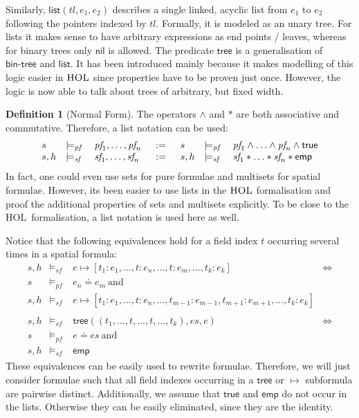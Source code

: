 \documentclass{scrartcl}
\theoremstyle{definition}
\newtheorem{definition}{Definition}
\newcommand{\HOL}{{\textsc{HOL}}}
\newcommand{\nil}{{\textsf{nil}}}
\newcommand{\pftrue}{{\textsf{true}}}
\newcommand{\pfequal}[2]{\ensuremath{#1 \doteq #2}}
\newcommand{\modelspf}{{\models_{\textit{pf}}\ }}
\newcommand{\modelssf}{{\models_{\textit{sf}}\ }}
\newcommand{\sfemp}{{\textsf{emp}}}
\newcommand{\sftree}{{\textsf{tree}}}
\newcommand{\sfpointsto}[2]{#1 \mapsto [#2]}
\newcommand{\sfbintree}{{\textsf{bin-tree}}}
\newcommand{\sflist}{{\textsf{list}}}
\newcommand{\varpf}[1]{\textit{pf}_{#1}}
\newcommand{\varsf}[1]{\textit{sf}_{#1}}
\begin{document}
Similarly, $\sflist (tl, e_1, e_2)$ describes a single linked, acyclic list
from $e_1$ to $e_2$ following the pointers indexed by $tl$. Formally, it is
modeled as an unary tree. For lists it makes
sense to have arbitrary expressions as end points / leaves, whereas for binary
trees only $\nil$ is allowed. The predicate $\sftree$ is a generalisation of
$\sfbintree$ and $\sflist$. It has been introduced mainly because it makes
modelling of this logic easier in $\HOL$ since properties have to be proven
just once. However, the logic is now able to talk about trees of arbitrary, but
fixed width.
\bigskip

\begin{definition}[Normal Form]
The operators $\wedge$ and $*$ are both associative and
commutative. Therefore, a list notation can be used:
%
\setlength{\arraycolsep}{2pt}
\[
\begin{array}{lll@{\hspace{15pt}}c@{\hspace{15pt}}lll}
   s & \modelspf & \varpf 1, \ldots, \varpf n & := & s & \modelspf & \varpf 1 \wedge \ldots \wedge
   \varpf n \wedge \pftrue \\
   s, h & \modelssf & \varsf 1, \ldots, \varsf n & := & s, h & \modelssf & \varsf 1 * \ldots *
   \varsf n * \sfemp
\end{array}
\]
%
In fact, one could even use sets for pure formulae and multisets for spatial
formulae. However, its been easier to use lists in the $\HOL$ formalisation
and proof the additional properties of sets and multisets explicitly.
To be close to the \HOL\ formalisation, a list notation is used here as well.

Notice that the following equivalences hold for a field index $t$
occurring several times in a spatial formula:
%
\[
\begin{array}{lllr}
s, h & \modelssf & \sfpointsto e {t_1:e_1, \ldots, t: e_n, \ldots, t:
  e_m, \ldots, t_k : e_k} & \Longleftrightarrow \\
s & \modelspf & \pfequal {e_n} {e_m}\ \text{and} \\
s, h & \modelssf & \sfpointsto e {t_1:e_1, \ldots, t: e_n, \ldots, t_{m-1}:
  e_{m-1}, t_{m+1}: e_{m+1}, \ldots, t_k : e_k} \\ \\

s, h & \modelssf & \sftree \left((t_1, \ldots, t, \ldots, t, \ldots,
  t_k),\textit{es},e\right) & \Longleftrightarrow \\
s & \modelspf & \pfequal {e} {\textit{es}}\ \text{and} \\
s, h & \modelssf & \sfemp
\end{array}
\]
%
These equivalences can be easily used to rewrite formulae. Therefore, we will
just consider formulae such that all field indexes occurring in a $\sftree$ or
$\mapsto$ subformula are pairwise distinct. Additionally, we assume that
$\pftrue$ and $\sfemp$ do not occur in the lists. Otherwise they can be easily
eliminated, since they are the identity.


\end{definition}
\end{document}
